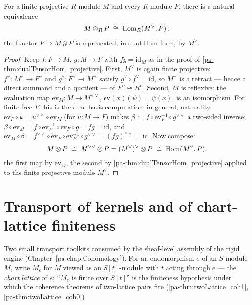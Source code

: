 \begin{theorem}
  \label{pa-thm:tensorDualHom_projective}
  \leanok

  For a finite projective \(R\)-module \(M\) and every \(R\)-module \(P\), there is a
  natural equivalence
  \[
    M \otimes_R P \;\cong\; \operatorname{Hom}_R(M^{\vee}, P) :
  \]
  the functor \(P \mapsto M \otimes P\) is represented, in dual-Hom form, by
  \(M^{\vee}\).
\end{theorem}
\begin{proof}
  \leanok
  Keep \(f : F \to M\), \(g : M \to F\) with \(f g = \mathrm{id}_M\) as in the proof of
  \ref{pa-thm:dualTensorHom_projective}. First, \(M^{\vee}\) is again finite projective:
  \(f^{\vee} : M^{\vee} \to F^{\vee}\) and \(g^{\vee} : F^{\vee} \to M^{\vee}\) satisfy
  \(g^{\vee} \circ f^{\vee} = \mathrm{id}\), so \(M^{\vee}\) is a retract --- hence a
  direct summand and a quotient --- of \(F^{\vee} \cong R^n\). Second, \(M\) is
  reflexive: the evaluation map \(\mathrm{ev}_M : M \to M^{\vee\vee}\),
  \(\mathrm{ev}(x)(\psi) = \psi(x)\), is an isomorphism. For finite free \(F\) this is
  the dual-basis computation; in general, naturality
  \(\mathrm{ev}_F \circ u = u^{\vee\vee} \circ \mathrm{ev}_M\) (for \(u : M \to F\))
  makes \(\beta := f \circ \mathrm{ev}_F^{-1} \circ g^{\vee\vee}\) a two-sided inverse:
  \(\beta \circ \mathrm{ev}_M = f \circ \mathrm{ev}_F^{-1} \circ \mathrm{ev}_F \circ g
  = f g = \mathrm{id}\), and \(\mathrm{ev}_M \circ \beta = f^{\vee\vee} \circ
  \mathrm{ev}_F \circ \mathrm{ev}_F^{-1} \circ g^{\vee\vee} = (f g)^{\vee\vee} =
  \mathrm{id}\). Now compose:
  \[
    M \otimes P \;\cong\; M^{\vee\vee} \otimes P
      = (M^{\vee})^{\vee} \otimes P \;\cong\; \operatorname{Hom}(M^{\vee}, P),
  \]
  the first map by \(\mathrm{ev}_M\), the second by
  \ref{pa-thm:dualTensorHom_projective} applied to the finite projective module
  \(M^{\vee}\).
\end{proof}

\section{Transport of kernels and of chart-lattice finiteness}
\label{pa-sec:aeval_transport}

Two small transport toolkits consumed by the sheaf-level assembly of the rigid engine
(Chapter~\ref{pa-chap:Cohomology}). For an endomorphism \(e\) of an \(S\)-module \(M\),
write \(M_e\) for \(M\) viewed as an \(S[t]\)-module with \(t\) acting through \(e\) ---
the \emph{chart lattice} of \(e\); ``\(M_e\) is finite over \(S[t]\)'' is the finiteness
hypothesis under which the coherence theorems of two-lattice pairs fire
(\ref{pa-thm:twoLattice_coh1}, \ref{pa-thm:twoLattice_coh0}).

